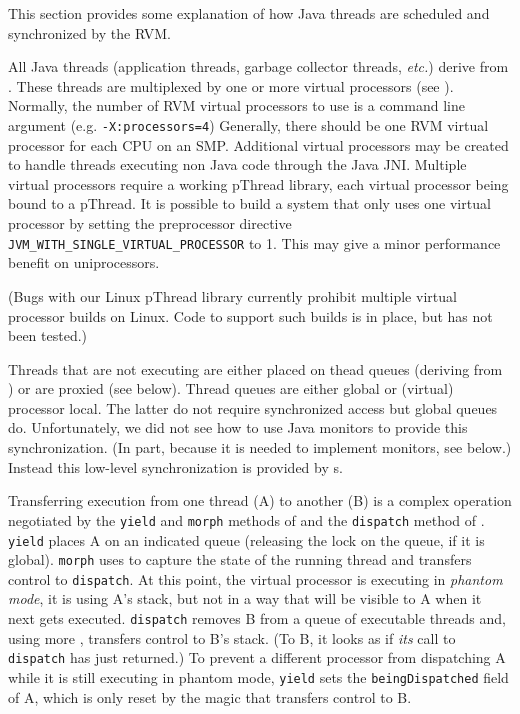 This section provides some explanation of how Java threads are
scheduled and synchronized by the RVM.


All Java threads (application threads, garbage collector threads, {\em
etc.})  derive from \VMThreadURL.  These threads are multiplexed by
one or more virtual processors (see \VMProcessorURL).  Normally, the
number of RVM virtual processors to use is a command line argument
(e.g. {\tt -X:processors=4}) Generally, there should be one RVM
virtual processor for each CPU on an SMP.  Additional virtual
processors may be created to handle threads executing non Java code
through the Java JNI.  Multiple virtual processors require a working
pThread library, each virtual processor being bound to a pThread.  It
is possible to build a system that only uses one virtual processor by
setting the preprocessor directive {\tt
JVM\_WITH\_SINGLE\_VIRTUAL\_PROCESSOR} to 1.  This may give a minor
performance benefit on uniprocessors.

(Bugs with our Linux pThread library currently prohibit multiple
virtual processor builds on Linux.  Code to support such builds is in
place, but has not been tested.)

Threads that are not executing are either placed on thead queues
(deriving from \VMAbstractThreadQueueURL) or are proxied (see below).
Thread queues are either global or (virtual) processor local.  The
latter do not require synchronized access but global queues do.
Unfortunately, we did not see how to use Java monitors to provide
this synchronization.  (In part, because it is needed to implement
monitors, see below.)  Instead this low-level synchronization is
provided by {\VMProcessorLockURL}s.

Transferring execution from one thread (A) to another (B) is a complex
operation negotiated by the {\tt yield} and {\tt morph} methods of
\VMThreadURL and the {\tt dispatch} method of \VMProcessorURL.  {\tt
yield} places A on an indicated queue (releasing the lock on the
queue, if it is global).  {\tt morph} uses \VMMagicURL to capture the
state of the running thread and transfers control to {\tt dispatch}.
At this point, the virtual processor is executing in {\em phantom
mode}, it is using A's stack, but not in a way that will be visible to
A when it next gets executed.  {\tt dispatch} removes B from a queue
of executable threads and, using more \VMMagicURL, transfers control
to B's stack.  (To B, it looks as if {\em its} call to {\tt dispatch}
has just returned.)  To prevent a different processor from dispatching
A while it is still executing in phantom mode, {\tt yield} sets the
{\tt beingDispatched} field of A, which is only reset by the magic
that transfers control to B.

